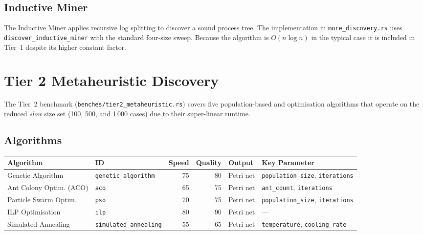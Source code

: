 \documentclass[11pt,a4paper]{article}
\begin{document}
\subsection{Inductive Miner}

The Inductive Miner applies recursive log splitting to discover a sound
process tree. The implementation in \texttt{more\_discovery.rs} uses
\texttt{discover\_inductive\_miner} with the standard four-size sweep.
Because the algorithm is $O(n \log n)$ in the typical case it is
included in Tier~1 despite its higher constant factor.

\section{Tier 2 Metaheuristic Discovery}
\label{sec:tier2}

The Tier~2 benchmark (\texttt{benches/tier2\_metaheuristic.rs}) covers five
population-based and optimisation algorithms that operate on the reduced
\emph{slow} size set (100, 500, and 1\,000 cases) due to their super-linear
runtime.

\subsection{Algorithms}

\begin{center}
\begin{tabular}{@{}llrrll@{}}
\toprule
\textbf{Algorithm} & \textbf{ID} & \textbf{Speed} & \textbf{Quality} &
\textbf{Output} & \textbf{Key Parameter} \\
\midrule
Genetic Algorithm    & \texttt{genetic\_algorithm} & 75 & 80 & Petri net &
  \texttt{population\_size}, \texttt{iterations} \\
Ant Colony Optim. (ACO) & \texttt{aco} & 65 & 75 & Petri net &
  \texttt{ant\_count}, \texttt{iterations} \\
Particle Swarm Optim. & \texttt{pso} & 70 & 75 & Petri net &
  \texttt{population\_size}, \texttt{iterations} \\
ILP Optimisation     & \texttt{ilp} & 80 & 90 & Petri net & --- \\
Simulated Annealing  & \texttt{simulated\_annealing} & 55 & 65 & Petri net &
  \texttt{temperature}, \texttt{cooling\_rate} \\
\bottomrule
\end{tabular}
\end{center}
\end{document}
